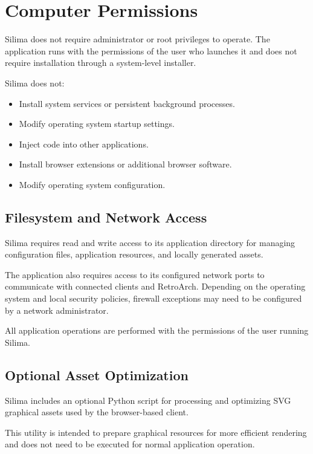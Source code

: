 \section{Computer Permissions}

Silima does not require administrator or root privileges to operate.
The application runs with the permissions of the user who launches it
and does not require installation through a system-level installer.

Silima does not:
\begin{itemize}
    \item Install system services or persistent background processes.
    \item Modify operating system startup settings.
    \item Inject code into other applications.
    \item Install browser extensions or additional browser software.
    \item Modify operating system configuration.
\end{itemize}

\subsection{Filesystem and Network Access}

Silima requires read and write access to its application directory
for managing configuration files, application resources, and locally
generated assets.

The application also requires access to its configured network ports
to communicate with connected clients and RetroArch. Depending on
the operating system and local security policies, firewall exceptions
may need to be configured by a network administrator.

All application operations are performed with the permissions of
the user running Silima.

\subsection{Optional Asset Optimization}

Silima includes an optional Python script for processing and
optimizing SVG graphical assets used by the browser-based client.

This utility is intended to prepare graphical resources for more
efficient rendering and does not need to be executed for normal
application operation.

